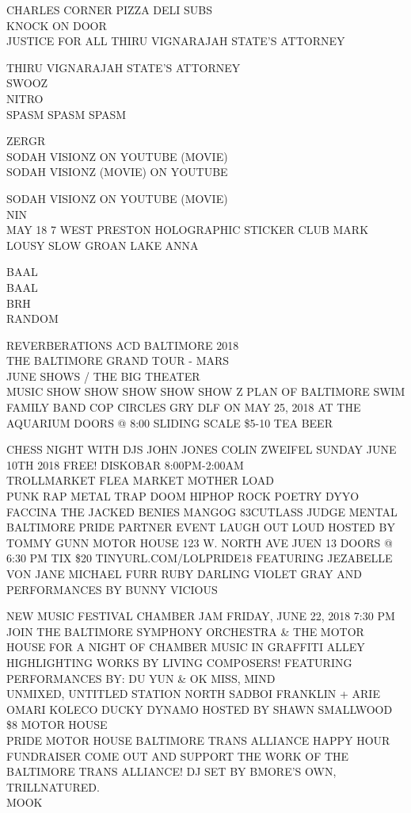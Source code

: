 \documentclass[10pt,letterpaper]{article}
\begin{document}
CHARLES CORNER PIZZA DELI SUBS\\
KNOCK ON DOOR\\
JUSTICE FOR ALL THIRU VIGNARAJAH STATE'S ATTORNEY

THIRU VIGNARAJAH STATE'S ATTORNEY\\
SWOOZ\\
NITRO\\
SPASM SPASM SPASM

ZERGR\\
SODAH VISIONZ ON YOUTUBE (MOVIE)\\
SODAH VISIONZ (MOVIE) ON YOUTUBE

SODAH VISIONZ ON YOUTUBE (MOVIE)\\
NIN\\
MAY 18 7 WEST PRESTON HOLOGRAPHIC STICKER CLUB MARK LOUSY SLOW GROAN LAKE ANNA

BAAL\\
BAAL\\
BRH\\
RANDOM

REVERBERATIONS ACD BALTIMORE 2018\\
THE BALTIMORE GRAND TOUR {-} MARS\\
JUNE SHOWS / THE BIG THEATER\\
MUSIC SHOW SHOW SHOW SHOW SHOW Z PLAN OF BALTIMORE SWIM FAMILY BAND COP CIRCLES GRY DLF ON MAY 25, 2018 AT THE AQUARIUM DOORS @ 8:00 SLIDING SCALE \$5{-}10 TEA BEER

CHESS NIGHT WITH DJS JOHN JONES COLIN ZWEIFEL SUNDAY JUNE 10TH 2018 FREE!  DISKOBAR 8:00PM{-}2:00AM\\
TROLLMARKET FLEA MARKET MOTHER LOAD\\
PUNK RAP METAL TRAP DOOM HIPHOP ROCK POETRY DYYO FACCINA THE JACKED BENIES MANGOG 83CUTLASS JUDGE MENTAL\\
BALTIMORE PRIDE PARTNER EVENT LAUGH OUT LOUD HOSTED BY TOMMY GUNN MOTOR HOUSE 123 W. NORTH AVE JUEN 13 DOORS @ 6:30 PM TIX \$20 TINYURL.COM/LOLPRIDE18 FEATURING JEZABELLE VON JANE MICHAEL FURR RUBY DARLING VIOLET GRAY AND PERFORMANCES BY BUNNY VICIOUS

NEW MUSIC FESTIVAL CHAMBER JAM FRIDAY, JUNE 22, 2018 7:30 PM JOIN THE BALTIMORE SYMPHONY ORCHESTRA \& THE MOTOR HOUSE FOR A NIGHT OF CHAMBER MUSIC IN GRAFFITI ALLEY HIGHLIGHTING WORKS BY LIVING COMPOSERS!  FEATURING PERFORMANCES BY: DU YUN \& OK MISS, MIND\\
UNMIXED, UNTITLED STATION NORTH SADBOI FRANKLIN + ARIE OMARI KOLECO DUCKY DYNAMO HOSTED BY SHAWN SMALLWOOD \$8 MOTOR HOUSE\\
PRIDE MOTOR HOUSE BALTIMORE TRANS ALLIANCE HAPPY HOUR FUNDRAISER COME OUT AND SUPPORT THE WORK OF THE BALTIMORE TRANS ALLIANCE!  DJ SET BY BMORE'S OWN, TRILLNATURED.\\
MOOK
\end{document}
